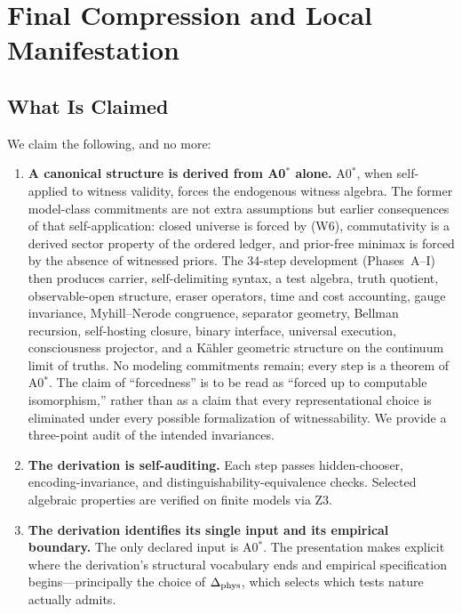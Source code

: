 
\section{Final Compression and Local Manifestation}
\label{sec:discussion}

\subsection{What Is Claimed}
\label{sec:discussion:claimed}

We claim the following, and no more:

\begin{enumerate}[label=(\roman*)]
  \item \textbf{A canonical structure is derived from A0$^*$ alone.}
        A0$^*$, when self-applied to witness validity, forces the endogenous
        witness algebra.  The former model-class commitments are not extra
        assumptions but earlier consequences of that self-application: closed
        universe is forced by (W6), commutativity is a derived sector property
        of the ordered ledger, and prior-free minimax is forced by the absence
        of witnessed priors.  The 34-step development (Phases~A--I) then
        produces carrier, self-delimiting syntax, a test algebra, truth
        quotient, observable-open structure, eraser operators, time and cost
        accounting, gauge invariance, Myhill--Nerode congruence, separator
        geometry, Bellman recursion, self-hosting closure, binary interface,
        universal execution, consciousness projector, and a K\"{a}hler geometric
        structure on the continuum limit of truths.  No modeling commitments
        remain; every step is a theorem of A0$^*$.  The claim of ``forcedness''
        is to be read as ``forced up to computable isomorphism,'' rather than as
        a claim that every representational choice is eliminated under every
        possible formalization of witnessability.  We provide a three-point
        audit of the intended invariances.

  \item \textbf{The derivation is self-auditing.}
        Each step passes hidden-chooser, encoding-invariance, and
        distinguishability-equivalence checks.  Selected algebraic
        properties are verified on finite models via Z3.

  \item \textbf{The derivation identifies its single input and its empirical boundary.}
        The only declared input is A0$^*$.  The presentation makes explicit
        where the derivation's structural vocabulary ends and empirical
        specification begins---principally the choice of
        $\Delta_{\mathrm{phys}}$, which selects which tests nature actually
        admits.
\end{enumerate}

